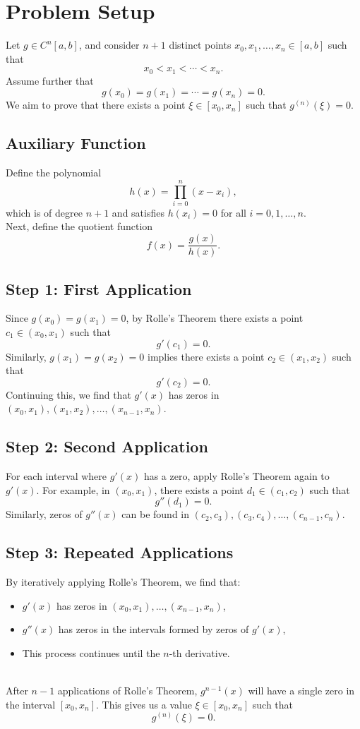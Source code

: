 \documentclass{article}
\begin{document}
\section*{Problem Setup}

Let \(g \in C^n[a, b]\), and consider \(n+1\) distinct points \(x_0, x_1, \ldots, x_n \in [a, b]\) such that 
\[
x_0 < x_1 < \cdots < x_n.
\]
Assume further that
\[
g(x_0) = g(x_1) = \cdots = g(x_n) = 0.
\]
We aim to prove that there exists a point \(\xi \in [x_0, x_n]\) such that \(g^{(n)}(\xi) = 0\).

\subsection*{Auxiliary Function}

Define the polynomial
\[
h(x) = \prod_{i=0}^n (x - x_i),
\]
which is of degree \(n+1\) and satisfies \(h(x_i) = 0\) for all \(i = 0, 1, \ldots, n\). \\Next, define the quotient function
\[
f(x) = \frac{g(x)}{h(x)}.
\]

\subsection*{Step 1: First Application}
Since \(g(x_0) = g(x_1) = 0\), by Rolle’s Theorem there exists a point \(c_1 \in (x_0, x_1)\) such that 
\[
g'(c_1) = 0.
\]
Similarly, \(g(x_1) = g(x_2) = 0\) implies there exists a point \(c_2 \in (x_1, x_2)\) such that 
\[
g'(c_2) = 0.
\]
Continuing this, we find that \(g'(x)\) has zeros in \((x_0, x_1), (x_1, x_2), \ldots, (x_{n-1}, x_n)\).

\subsection*{Step 2: Second Application}
For each interval where \(g'(x)\) has a zero, apply Rolle’s Theorem again to \(g'(x)\). For example, in \((x_0, x_1)\), there exists a point \(d_1 \in (c_1, c_2)\) such that
\[
g''(d_1) = 0.
\]
Similarly, zeros of \(g''(x)\) can be found in \((c_2, c_3), (c_3, c_4), \ldots, (c_{n-1}, c_n)\).

\subsection*{Step 3: Repeated Applications}
By iteratively applying Rolle’s Theorem, we find that:
\begin{itemize}
    \item \(g'(x)\) has zeros in \((x_0, x_1), \ldots, (x_{n-1}, x_n)\),
    \item \(g''(x)\) has zeros in the intervals formed by zeros of \(g'(x)\),
    \item This process continues until the \(n\)-th derivative.\\
\end{itemize}
\\
After \(n-1\) applications of Rolle’s Theorem, \(g^{n-1}(x)\) will have a single zero in the interval \([x_0,x_n]\). This gives us a value \(\xi \in [x_0, x_n]\) such that 
\[
g^{(n)}(\xi) = 0.
\]
\end{document}

